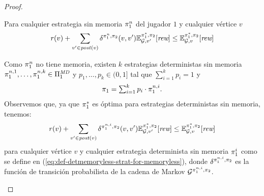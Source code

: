 \begin{proof}
  \begin{claim}
  Para cualquier estrategia sin memoria $\pi_{1}^n$ del jugador $1$ y cualquier vértice $v$ 
  \begin{equation*}
    \mathit{r}(v) + \sum_{v' \in \mathit{post}(v)} \delta^{\pi_{1}^n,\pi_{2}}(v, v') \mathbb{E}^{\pi^*_{1}, \pi_{2}}_{\mathcal{G},v'}[\textit{rew}] \leq \mathbb{E}^{\pi^*_{1}, \pi_{2}}_{\mathcal{G},v}[\textit{rew}]
  \end{equation*}
  \end{claim}
  \begin{proofofclaim}
    Como $\pi_{1}^n$ no tiene memoria, existen $k$ estrategias deterministas sin memoria
    $\pi_{1}^{n,1},\ldots,\pi_{1}^{n,k}\in\Pi^{\textit{MD}}_{1}$ y
    $p_1,\ldots,p_k \in(0,1]$ tal que $\sum_{i=1}^kp_i =1$ y 
    \begin{equation}\label{eq:def-detmemoryless-strat-for-memoryless}
      \pi_{1}=\textstyle\sum_{i=1}^k p_i\cdot\pi_{1}^{n,i}.
    \end{equation}
    Observemos que, ya que $\pi^*_{1}$ es óptima para estrategias deterministas sin memoria, tenemos:
    \begin{equation}\label{eq:semimarkov-to-detmemoryless:optimality}
      \mathit{r}(v) + \sum_{v' \in \mathit{post}(v)} \delta^{\pi_{1}^{n,i},\pi_{2}}(v, v') \mathbb{E}^{\pi^*_{1}, \pi_{2}}_{\mathcal{G},v'}[\textit{rew}] \leq \mathbb{E}^{\pi^*_{1}, \pi_{2}}_{\mathcal{G},v}[\textit{rew}]
    \end{equation}
    para cualquier vértice $v$ y cualquier estrategia determinista sin memoria
    $\pi_{1}^i$ como se define en
    (\ref{eq:def-detmemoryless-strat-for-memoryless}), donde
    $\delta^{\pi_{1}^{n,i},\pi_{2}}$ es la función de transición probabilista de la cadena de Markov $\mathcal{G}^{\pi_{1}^{n,i},\pi_{2}}$.


\end{proofofclaim}
\end{proof}
